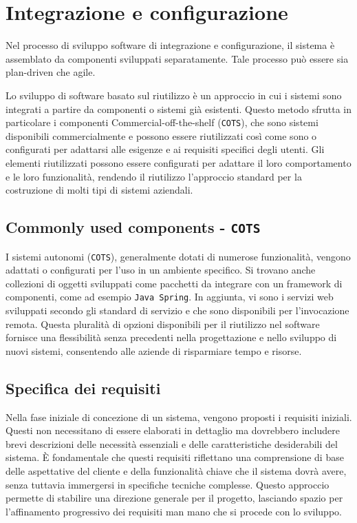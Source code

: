 \section{Integrazione e configurazione}
Nel processo di sviluppo software di integrazione e configurazione, il sistema 
è assemblato da componenti sviluppati separatamente. Tale processo può essere
sia plan-driven che agile.

Lo sviluppo di software basato sul riutilizzo è un approccio in cui i sistemi
sono integrati a partire da componenti o sistemi già esistenti. Questo metodo
sfrutta in particolare i componenti Commercial-off-the-shelf (\texttt{COTS}),
che sono sistemi disponibili commercialmente e possono essere riutilizzati così
come sono o configurati per adattarsi alle esigenze e ai requisiti specifici degli
utenti. Gli elementi riutilizzati possono essere configurati per adattare il loro
comportamento e le loro funzionalità, rendendo il riutilizzo l'approccio standard
per la costruzione di molti tipi di sistemi aziendali.
\subsection{Commonly used components - \texttt{COTS}}
I sistemi autonomi (\texttt{COTS}), generalmente dotati di numerose funzionalità, vengono
adattati o configurati per l'uso in un ambiente specifico. Si trovano anche collezioni
di oggetti sviluppati come pacchetti da integrare con un framework di componenti,
come ad esempio \texttt{Java Spring}. In aggiunta, vi sono i servizi web sviluppati secondo
gli standard di servizio e che sono disponibili per l'invocazione remota. Questa
pluralità di opzioni disponibili per il riutilizzo nel software fornisce una
flessibilità senza precedenti nella progettazione e nello sviluppo di nuovi sistemi,
consentendo alle aziende di risparmiare tempo e risorse.
\subsection{Specifica dei requisiti}
Nella fase iniziale di concezione di un sistema, vengono proposti i requisiti
iniziali. Questi non necessitano di essere elaborati in dettaglio ma dovrebbero
includere brevi descrizioni delle necessità essenziali e delle caratteristiche
desiderabili del sistema. È fondamentale che questi requisiti riflettano una
comprensione di base delle aspettative del cliente e della funzionalità chiave
che il sistema dovrà avere, senza tuttavia immergersi in specifiche tecniche
complesse. Questo approccio permette di stabilire una direzione generale per
il progetto, lasciando spazio per l'affinamento progressivo dei requisiti man
mano che si procede con lo sviluppo.

